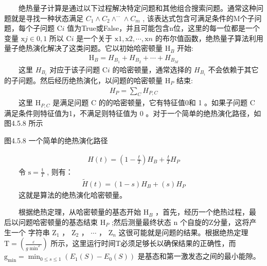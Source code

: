 \documentclass[a4paper,11pt,english]{sphinxmanual}
\begin{document}
\sphinxAtStartPar
  绝热量子计算是通过以下过程解决特定问题和其他组合搜索问题。通常这种问题就是寻找一种状态满足  \(C_1 \wedge C_2 \wedge^{\cdots} \wedge C_{m}\) , 该表达式包含可满足条件的M个子问题，每个子问题  \(\mathrm{C}{i}\) 值为True或False，并且可能包含n位，这里的每一位都是一个变量  \(\mathrm{x}{j} \in{0,1}\) 所以  \(\mathrm{C}{i}\) 是一个关于  \(\mathrm{x}{1}, \mathrm{x}{2}, \cdots, \mathrm{x}{n}\) 的布尔值函数，绝热量子算法利用量子绝热演化解决了这类问题。它以初始哈密顿量  \(\mathrm{H}_{B}\) 开始:
\begin{equation*}
\begin{split}\mathrm{H}_{B}=H_{B_{1}}+H_{B_{2}}+\cdots+H_{B_{M}}\end{split}
\end{equation*}
\sphinxAtStartPar
  这里  \(H_{B_{i}}\) 对应于该子问题  \(\mathrm{C}{i}\) 的哈密顿量，通常选择的  \(H_{B_{i}}\) 不会依赖于其它的子问题。然后经历绝热演化，以问题的哈密顿量  \(\mathrm{H}_{P}\) 结束:
\begin{equation*}
\begin{split}H_{P}=\sum_{C} H_{P, C}\end{split}
\end{equation*}
\sphinxAtStartPar
  这里  \(\mathrm{H}_{P, C}\) 是满足问题  \(\mathrm{C}\) 的的哈密顿量，它有特征值0和 1 。如果子问题  \(\mathrm{C}\) 满足条件则特征值为1，不满足则特征值为 0 。对于一个简单的绝热演化路径，如图4.5.8 所示


\begin{center}图4.5.8 一个简单的绝热演化路径
\end{center}\begin{equation*}
\begin{split}H(t)=\left(1-\frac{t}{T}\right) H_{B}+\frac{t}{T} H_{P}\end{split}
\end{equation*}
\sphinxAtStartPar
  令  \(\mathrm{s}=\frac{\mathrm{t}}{T}\) , 则有：
\begin{equation*}
\begin{split}\tilde{H}(t)=(1-s) H_{B}+(s) H_{P}\end{split}
\end{equation*}
\sphinxAtStartPar
  这就是算法的绝热演化哈密顿量。

\sphinxAtStartPar
  根据绝热定理，从哈密顿量的基态开始  \(\mathrm{H}_{B}\) ，首先，经历一个绝热过程，最后以问题哈密顿量的基态结束 \(\mathrm{H}_{P}\) ;然后测量最终状态 \(\mathrm{n}\) 个自旋的Z分量，这将产生一个 字符串  \(\mathrm{Z}_{1}\) ， \(\mathrm{Z}_{2}\) ， \(\cdots\) ， \(\mathrm{Z}_{n}\) 这很可能就是问题的结果。根据绝热定理  \(\mathrm{T}=\left(\frac{\varepsilon}{g{\min }^{2}}\right)\) 所示，这里运行时间T必须足够长以确保结果的正确性，而 \(\mathrm{g}_{\min }=\min_{0 \leq s \leq 1}(E_{1}(S)-E_{0}(S))\) 是基态和第一激发态之间的最小能隙。
\end{document}
